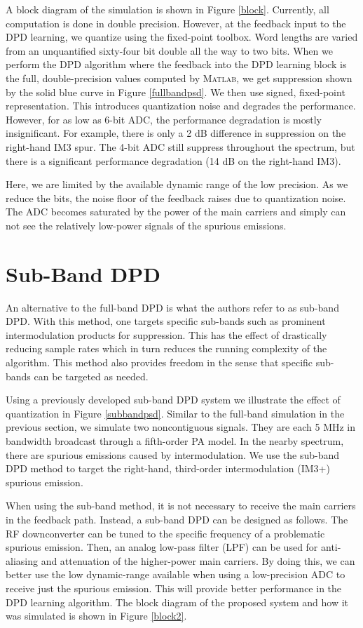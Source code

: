 \documentclass[conference]{IEEEtran}
\begin{document}
A block diagram of the simulation is shown in Figure \ref{block}. Currently, all computation is done in double precision. However, at the feedback input to the DPD learning, we quantize using the fixed-point toolbox. Word lengths are varied from an unquantified sixty-four bit double all the way to two bits. When we perform the DPD algorithm where the feedback into the DPD learning block is the full, double-precision values computed by \textsc{Matlab}, we get suppression shown by the solid blue curve in Figure \ref{fullbandpsd}. We then use signed, fixed-point representation. This introduces quantization noise and degrades the performance. However, for as low as 6-bit ADC, the performance degradation is mostly insignificant. For example, there is only a 2 dB difference in suppression on the right-hand IM3 spur. The 4-bit ADC still suppress throughout the spectrum, but there is a significant performance degradation (14 dB on the right-hand IM3). 

Here, we are limited by the available dynamic range of the low precision. 
As we reduce the bits, the noise floor of the feedback raises due to quantization noise. 
The ADC becomes saturated by the power of the main carriers and simply can not see the relatively low-power signals of the spurious emissions. 

\section{Sub-Band DPD}
An alternative to the full-band DPD is what the authors refer to as sub-band DPD. 
With this method, one targets specific sub-bands such as prominent intermodulation products for suppression. 
This has the effect of drastically reducing sample rates which in turn reduces the running complexity of the algorithm. 
This method also provides freedom in the sense that specific sub-bands can be targeted as needed. 

Using a previously developed sub-band DPD system \cite{TMTT_SubbandDPD} we illustrate the effect of quantization in Figure \ref{subbandpsd}. Similar to the full-band simulation in the previous section, we simulate two noncontiguous signals. They are each 5 MHz in bandwidth broadcast through a fifth-order PA model. 
In the nearby spectrum, there are spurious emissions caused by intermodulation. We use the sub-band DPD method to target the right-hand, third-order intermodulation (IM3+) spurious emission.

When using the sub-band method, it is not necessary to receive the main carriers in the feedback path.
Instead, a sub-band DPD can be designed as follows. 
The RF downconverter can be tuned to the specific frequency of a problematic spurious emission.
Then, an analog low-pass filter (LPF) can be used for anti-aliasing and attenuation of the higher-power main carriers. 
By doing this, we can better use the low dynamic-range available when using a low-precision ADC to receive just the spurious emission.
This will provide better performance in the DPD learning algorithm. 
The block diagram of the proposed system and how it was simulated is shown in Figure \ref{block2}.
\end{document}
